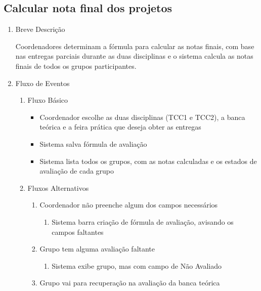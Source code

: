\subsection{Calcular nota final dos projetos}


\begin{enumerate}
    \item Breve Descrição


Coordenadores determinam a fórmula para calcular as notas finais, com base nas entregas parciais durante as duas disciplinas e o sistema calcula as notas finais de todos os grupos participantes.


    \item Fluxo de Eventos

\begin{enumerate}
    \item Fluxo Básico

\begin{itemize}
    \item Coordenador escolhe as duas disciplinas (TCC1 e TCC2), a banca teórica e a feira prática que deseja obter as entregas

    \item Sistema salva fórmula de avaliação

    \item Sistema lista todos os grupos, com as notas calculadas e os estados de avaliação de cada grupo
\end{itemize}

    \item Fluxos Alternativos

\begin{enumerate}
    \item Coordenador não preenche algum dos campos necessários

\begin{enumerate}
    \item Sistema barra criação de fórmula de avaliação, avisando os campos faltantes


\end{enumerate}
    \item Grupo tem alguma avaliação faltante

\begin{enumerate}
    \item Sistema exibe grupo, mas com campo de Não Avaliado


\end{enumerate}
    \item Grupo vai para recuperação na avaliação da banca teórica


\end{enumerate}
\end{enumerate}
\end{enumerate}
